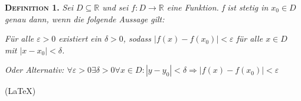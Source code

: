 \documentclass[14pt,a4paper]{extarticle}
\begin{document}
    \noindent\textbf{\textsc{Definition 1.}} \textit{Sei $D \subseteq \mathbb{R}$ und sei $f: D \rightarrow \mathbb{R}$ eine Funktion. f ist stetig in $x_0 \in D$ genau dann, wenn die folgende Aussage gilt:}

    \textit{Für alle $\varepsilon > 0$ existiert ein $\delta > 0$, sodass $| f(x)-f(x_0) | < \varepsilon$ für alle $x \in D$ mit $| x-x_0 | < \delta$.}

    \textit{Oder Alternativ: $\forall \varepsilon > 0 \exists \delta > 0 \forall x \in D : |y-y_0| < \delta \Rightarrow |f(x)-f(x_0)| < \varepsilon$}

    \bigskip
    (\LaTeX)
\end{document}
